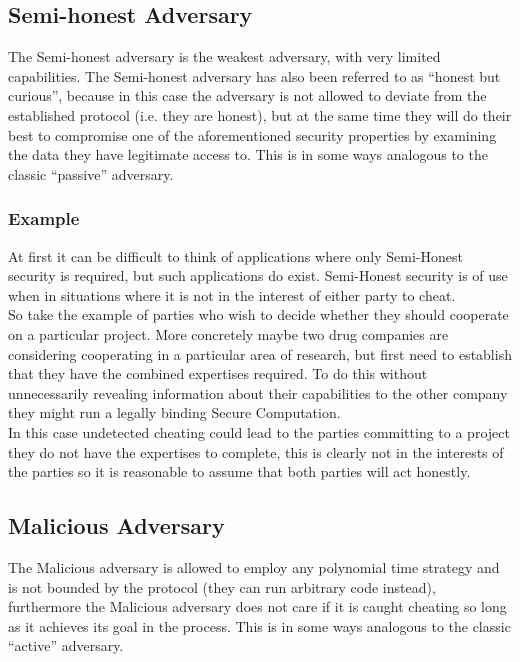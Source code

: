 \documentclass[ %
                    author={Nicholas Tutte},
                supervisor={Prof. Nigel Smart},
                    degree={MEng},
                     title={Secure Two Party Computation},
                  subtitle={A practical comparison of recent protocols},
                      type={Research - GG1K},
                      year={2015} ]{dissertation}
\begin{document}
			\subsection{Semi-honest Adversary}
				The Semi-honest adversary is the weakest adversary, with very limited capabilities. The Semi-honest adversary has also been referred to as ``honest but curious'', because in this case the adversary is not allowed to deviate from the established protocol (i.e. they are honest), but at the same time they will do their best to compromise one of the aforementioned security properties by examining the data they have legitimate access to. This is in some ways analogous to the classic ``passive'' adversary.

				\subsubsection{Example}

					At first it can be difficult to think of applications where only Semi-Honest security is required, but such applications do exist. Semi-Honest security is of use when in situations where it is not in the interest of either party to cheat.\\

					So take the example of parties who wish to decide whether they should cooperate on a particular project. More concretely maybe two drug companies are considering cooperating in a particular area of research, but first need to establish that they have the combined expertises required. To do this without unnecessarily revealing information about their capabilities to the other company they might run a legally binding Secure Computation.\\
					
					In this case undetected cheating could lead to the parties committing to a project they do not have the expertises to complete, this is clearly not in the interests of the parties so it is reasonable to assume that both parties will act honestly.\\



			\subsection{Malicious Adversary}
				The Malicious adversary is allowed to employ any polynomial time strategy and is not bounded by the protocol (they can run arbitrary code instead), furthermore the Malicious adversary does not care if it is caught cheating so long as it achieves its goal in the process. This is in some ways analogous to the classic ``active'' adversary.
\end{document}
